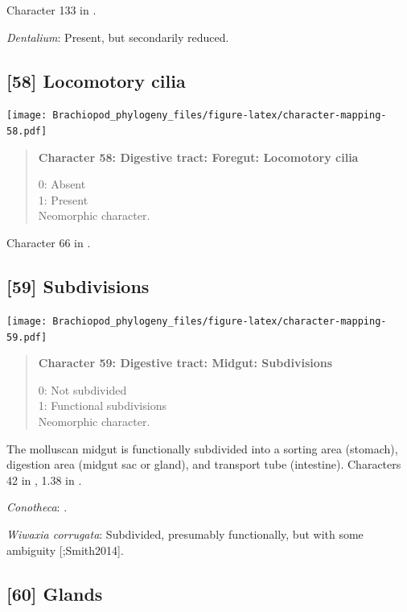 \documentclass[openany]{book}
\begin{document}
Character 133 in \citet{Grobe2007}.

\hypertarget{Dentalium-coding-57}{}
\emph{Dentalium}: Present, but secondarily reduced.

\subsection*{{[}58{]} Locomotory cilia}\label{locomotory-cilia}

\texttt{[image: Brachiopod\_phylogeny\_files/figure-latex/character-mapping-58.pdf]}

\begin{quote}
\textbf{Character 58: Digestive tract: Foregut: Locomotory cilia}

0: Absent\\
1: Present\\
Neomorphic character.
\end{quote}

Character 66 in \citet{Haszprunar2000}.

\subsection*{{[}59{]} Subdivisions}\label{subdivisions}

\texttt{[image: Brachiopod\_phylogeny\_files/figure-latex/character-mapping-59.pdf]}

\begin{quote}
\textbf{Character 59: Digestive tract: Midgut: Subdivisions}

0: Not subdivided\\
1: Functional subdivisions\\
Neomorphic character.
\end{quote}

The molluscan midgut is functionally subdivided into a sorting area
(stomach), digestion area (midgut sac or gland), and transport tube
(intestine). Characters 42 in \citet{Haszprunar2000}, 1.38 in
\citet{SPS1996}.

\hypertarget{Conotheca-coding-59}{}
\emph{Conotheca}: \citep{Devaere2014}.

\hypertarget{Wiwaxia_corrugata-coding-59}{}
\emph{Wiwaxia corrugata}: Subdivided, presumably functionally, but with
some ambiguity {[}\citet{Smith2012M};Smith2014{]}.

\subsection*{{[}60{]} Glands}\label{glands}
\end{document}
